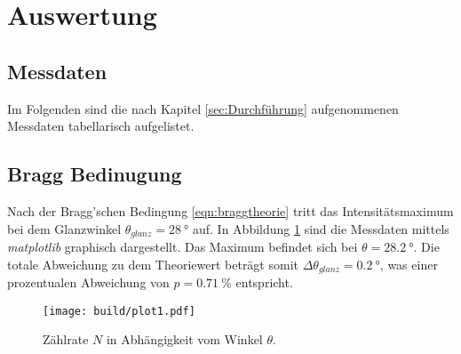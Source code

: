 \section{Auswertung}
\label{sec:Auswertung}
\subsection{Messdaten}
Im Folgenden sind die nach Kapitel \ref{sec:Durchführung} aufgenommenen Messdaten tabellarisch aufgelistet.



\subsection{Bragg Bedinugung}
\label{sec:brag}
Nach der Bragg'schen Bedingung \eqref{eqn:braggtheorie} tritt das Intensitätsmaximum bei dem Glanzwinkel $\theta_{glanz}=\SI{28}{\degree}$ auf.
In Abbildung \ref{fig:plot1} sind die Messdaten mittels \textit{matplotlib} \cite{matplotlib} graphisch dargestellt. Das Maximum befindet
sich bei $\theta=\SI{28.2}{\degree}$. Die totale Abweichung zu dem Theoriewert beträgt somit $\Delta\theta_{glanz}=\SI{0.2}{\degree}$,
was einer prozentualen Abweichung von $p=\SI{0.71}{\percent}$ entspricht.
\begin{figure}[H]
    \centering
    \texttt{[image: build/plot1.pdf]}
    \caption{Zählrate $N$ in Abhängigkeit vom Winkel $\theta$.}
    \label{fig:plot1}
\end{figure}

